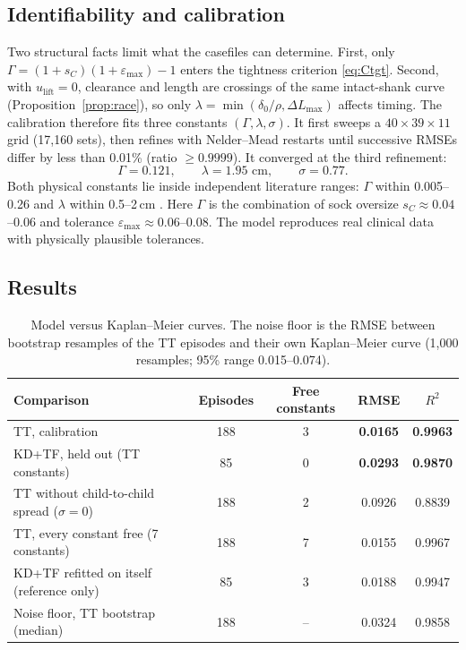 \documentclass[11pt]{article}
\newcommand{\eps}{\varepsilon}
\newcommand{\lift}{u_{\mathrm{lift}}}
\theoremstyle{definition}
\begin{document}
\subsection{Identifiability and calibration}
\label{sec:calib}
Two structural facts limit what the casefiles can determine. First, only $\Gamma=(1+s_C)(1+\eps_{\max})-1$ enters the tightness criterion \eqref{eq:Ctgt}. Second, with $\lift=0$, clearance and length are crossings of the same intact-shank curve (Proposition~\ref{prop:race}), so only $\lambda=\min(\delta_0/\rho,\Delta L_{\max})$ affects timing. The calibration therefore fits three constants $(\Gamma,\lambda,\sigma)$. It first sweeps a $40\times39\times11$ grid (17,160 sets), then refines with Nelder--Mead restarts until successive RMSEs differ by less than 0.01\% (ratio $\ge0.9999$). It converged at the third refinement:
\[
\Gamma=0.121,\qquad \lambda=1.95\text{ cm},\qquad \sigma=0.77 .
\]
Both physical constants lie inside independent literature ranges: $\Gamma$ within 0.005--0.26 \cite{volume1,patent,sanders2017,ghidiniPoster} and $\lambda$ within 0.5--2\,cm \cite{ghidini2025,ghidiniPoster}. Here $\Gamma$ is the combination of sock oversize $s_C\approx0.04$--$0.06$ and tolerance $\eps_{\max}\approx0.06$--$0.08$. The model reproduces real clinical data with physically plausible tolerances.

\subsection{Results}
\begin{table}[htbp]
\centering\small
\caption{Model versus Kaplan--Meier curves. The noise floor is the RMSE between bootstrap resamples of the TT episodes and their own Kaplan--Meier curve (1,000 resamples; 95\% range 0.015--0.074).}
\label{tab:rmse}
\begin{tabular}{@{}lcccc@{}}
\toprule
Comparison & Episodes & Free constants & RMSE & $R^2$\\
\midrule
TT, calibration & 188 & 3 & \textbf{0.0165} & \textbf{0.9963}\\
KD+TF, held out (TT constants) & 85 & 0 & \textbf{0.0293} & \textbf{0.9870}\\
TT without child-to-child spread ($\sigma=0$) & 188 & 2 & 0.0926 & 0.8839\\
TT, every constant free (7 constants) & 188 & 7 & 0.0155 & 0.9967\\
KD+TF refitted on itself (reference only) & 85 & 3 & 0.0188 & 0.9947\\
Noise floor, TT bootstrap (median) & 188 & -- & 0.0324 & 0.9858\\
\bottomrule
\end{tabular}
\end{table}
\end{document}
